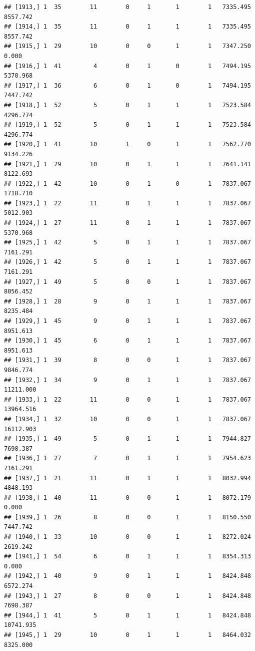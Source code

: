 \documentclass[
]{article}
\begin{document}
\begin{verbatim}
## [1913,] 1  35        11        0     1       1        1   7335.495   8557.742
## [1914,] 1  35        11        0     1       1        1   7335.495   8557.742
## [1915,] 1  29        10        0     0       1        1   7347.250      0.000
## [1916,] 1  41         4        0     1       0        1   7494.195   5370.968
## [1917,] 1  36         6        0     1       0        1   7494.195   7447.742
## [1918,] 1  52         5        0     1       1        1   7523.584   4296.774
## [1919,] 1  52         5        0     1       1        1   7523.584   4296.774
## [1920,] 1  41        10        1     0       1        1   7562.770   9134.226
## [1921,] 1  29        10        0     1       1        1   7641.141   8122.693
## [1922,] 1  42        10        0     1       0        1   7837.067   1718.710
## [1923,] 1  22        11        0     1       1        1   7837.067   5012.903
## [1924,] 1  27        11        0     1       1        1   7837.067   5370.968
## [1925,] 1  42         5        0     1       1        1   7837.067   7161.291
## [1926,] 1  42         5        0     1       1        1   7837.067   7161.291
## [1927,] 1  49         5        0     0       1        1   7837.067   8056.452
## [1928,] 1  28         9        0     1       1        1   7837.067   8235.484
## [1929,] 1  45         9        0     1       1        1   7837.067   8951.613
## [1930,] 1  45         6        0     1       1        1   7837.067   8951.613
## [1931,] 1  39         8        0     0       1        1   7837.067   9846.774
## [1932,] 1  34         9        0     1       1        1   7837.067  11211.000
## [1933,] 1  22        11        0     0       1        1   7837.067  13964.516
## [1934,] 1  32        10        0     0       1        1   7837.067  16112.903
## [1935,] 1  49         5        0     1       1        1   7944.827   7698.387
## [1936,] 1  27         7        0     1       1        1   7954.623   7161.291
## [1937,] 1  21        11        0     1       1        1   8032.994   4848.193
## [1938,] 1  40        11        0     0       1        1   8072.179      0.000
## [1939,] 1  26         8        0     0       1        1   8150.550   7447.742
## [1940,] 1  33        10        0     0       1        1   8272.024   2619.242
## [1941,] 1  54         6        0     1       1        1   8354.313      0.000
## [1942,] 1  40         9        0     1       1        1   8424.848   6572.274
## [1943,] 1  27         8        0     0       1        1   8424.848   7698.387
## [1944,] 1  41         5        0     1       1        1   8424.848  10741.935
## [1945,] 1  29        10        0     1       1        1   8464.032   8325.000

\end{verbatim}
\end{document}
